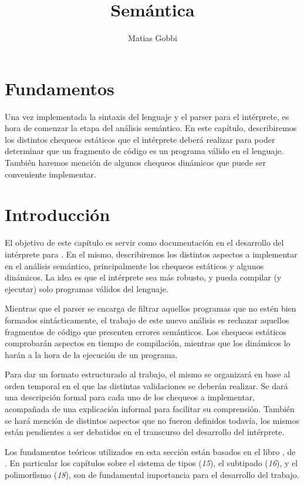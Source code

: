 \documentclass{article}
\begin{document}
\title{Semántica}
\author{Matias Gobbi}
\maketitle

\section*{Fundamentos}

Una vez implementada la sintaxis del lenguaje y el parser para el intérprete, es hora de comenzar la etapa del análisis semántico.
En este capítulo, describiremos los distintos chequeos estáticos que el intérprete deberá realizar para poder determinar que un fragmento de código es un programa válido en el lenguaje.
También haremos mención de algunos chequeos dinámicos que puede ser conveniente implementar.

\section{Introducción}

El objetivo de este capítulo es servir como documentación en el desarrollo del intérprete para \Lenguaje.
En el mismo, describiremos los distintos aspectos a implementar en el análisis semántico, principalmente los chequeos estáticos y algunos dinámicos.
La idea es que el intérprete sea más robusto, y pueda compilar (y ejecutar) solo programas válidos del lenguaje.

Mientras que el parser se encarga de filtrar aquellos programas que no estén bien formados sintácticamente, el trabajo de este nuevo análisis es rechazar aquellos fragmentos de código que presenten errores semánticos.
Los chequeos estáticos comprobarán aspectos en tiempo de compilación, mientras que los dinámicos lo harán a la hora de la ejecución de un programa.

Para dar un formato estructurado al trabajo, el mismo se organizará en base al orden temporal en el que las distintas validaciones se deberán realizar.
Se dará una descripción formal para cada uno de los chequeos a implementar, acompañada de una explicación informal para facilitar su comprensión.
También se hará mención de distintos aspectos que no fueron definidos todavía, los mismos están pendientes a ser debatidos en el transcurso del desarrollo del intérprete.

Los fundamentos teóricos utilizados en esta sección están basados en el libro \Libro, de \Autor.
En particular los capítulos sobre el sistema de tipos (\textit{15}), el subtipado (\textit{16}), y el polimorfismo (\textit{18}), son de fundamental importancia para el desarrollo del trabajo.
\end{document}
